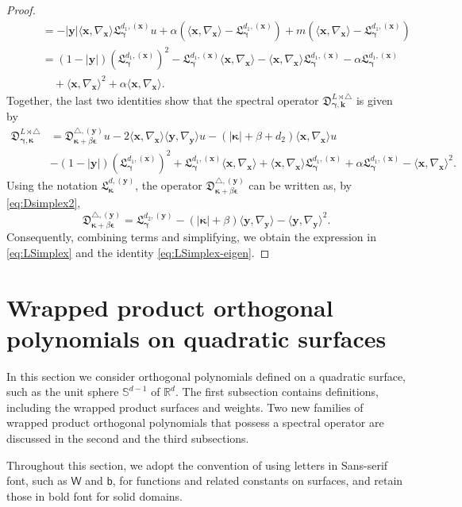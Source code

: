 \documentclass{amsart}
\theoremstyle{remark}
\def\la{{\langle}}
\def\ra{{\rangle}}
\def\sph{{\mathbb{S}^{d-1}}}
\def\sb{{\mathsf b}}
\def\sW{{\mathsf W}}
\def\fD{{\mathfrak D}}
\def\fL{{\mathfrak L}}
\def\a{{\alpha}}
\def\b{{\beta}}
\def\la{{\langle}}
\def\ra{{\rangle}}
\def\kb{{\bm k}}
\def\xb{{\bm x}}
\def\yb{{\bm y}}
\def\RR{{\mathbb R}}
\def\bep{{\boldsymbol{\epsilon}}}
\def\bg{{\boldsymbol{\gamma}}}
\def\bk{{\boldsymbol{\kappa}}}
\begin{document}
\begin{proof}
\begin{align*}
 & \qquad =  - |\yb| \la \bm x, \nabla_{\bm x} \ra \fL_\bg^{d_1, (\xb)} u + \a \left(\la \xb, \nabla_\xb\ra - \fL_\bg^{d_1, (\xb)}\right)
  + m\left(\la \xb, \nabla_\xb\ra - \fL_\bg^{d_1, (\xb)}\right) \\
  & \qquad 
   =(1-|\yb|) \left(\fL_\bg^{d_1, (\xb)}\right)^2 -\fL_\bg^{d_1, (\xb)} \la \xb, \nabla_\xb\ra- \la \xb, \nabla_\xb\ra \fL_\bg^{d_1, (\xb)} 
    - \alpha \fL_\bg^{d_1, (\xb)}\\
    & \qquad\quad + \la \xb, \nabla_{\xb} \ra^2 + \a  \la \xb, \nabla_{\xb} \ra. 
\end{align*}
Together, the last two identities show that the spectral operator $\fD_{\bg,\kb}^{L\rtimes \triangle}$ is given by
\begin{align*}
 \fD_{\bg,\bk}^{L\rtimes \triangle} & = \fD_{\bk+\b \bep}^{\triangle, (\yb)} u  
     -  2 \la \bm x, \nabla_{\bm x} \ra\la \bm y, \nabla_{\bm y} \ra u   - (|\bk|+\b+ d_2) \la \bm x, \nabla_{\bm x} \ra u \\
 & -  (1-|\yb|) \left(\fL_\bg^{d_1, (\xb)}\right)^2 + \fL_\bg^{d_1, (\xb)} \la \xb, \nabla_\xb\ra+\la \xb, \nabla_\xb\ra \fL_\bg^{d_1, (\xb)} 
  +\a \fL_\bg^{d_1, (\xb)} - \la \xb, \nabla_{\xb} \ra^2.   
\end{align*}
Using the notation $\fL_\bk^{d, (\yb)}$, the operator $\fD_{\bk+\b \bep}^{\triangle, (\yb)}$ can be written as, by 
\eqref{eq:Dsimplex2}, 
$$
  \fD_{\bk+\b \bep}^{\triangle, (\yb)} =  \fL_\bg^{d_2, (\yb)} - (|\bk| +\b)\la \yb, \nabla_{\yb}\ra - \la \yb, \nabla_{\yb} \ra^2.
$$ 
Consequently, combining terms and simplifying, we obtain the expression in \eqref{eq:LSimplex} and 
the identity \eqref{eq:LSimplex-eigen}. 
\end{proof}

\section{Wrapped product orthogonal polynomials on quadratic surfaces}
\setcounter{equation}{0}

In this section we consider orthogonal polynomials defined on a quadratic surface, such as the unit
sphere $\sph$ of $\RR^d$. The first subsection contains definitions, including the wrapped product
surfaces and weights. Two new families of wrapped product orthogonal polynomials
that possess a spectral operator are discussed in the second and the third subsections. 

Throughout this section, we adopt the convention of using letters in Sans-serif font, such as $\sW$ 
and $\sb$, for functions and related constants on surfaces, and retain those in bold font for solid
domains. 
\end{document}
